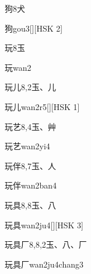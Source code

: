 \begin{entry}{狗}{8}{⽝}
  \begin{phonetics}{狗}{gou3}[][HSK 2]
  \end{phonetics}
\end{entry}

\begin{entry}{玩}{8}{⽟}
  \begin{phonetics}{玩}{wan2}
  \end{phonetics}
\end{entry}

\begin{entry}{玩儿}{8,2}{⽟、⼉}
  \begin{phonetics}{玩儿}{wan2r5}[][HSK 1]
  \end{phonetics}
\end{entry}

\begin{entry}{玩艺}{8,4}{⽟、⾋}
  \begin{phonetics}{玩艺}{wan2yi4}
  \end{phonetics}
\end{entry}

\begin{entry}{玩伴}{8,7}{⽟、⼈}
  \begin{phonetics}{玩伴}{wan2ban4}
  \end{phonetics}
\end{entry}

\begin{entry}{玩具}{8,8}{⽟、⼋}
  \begin{phonetics}{玩具}{wan2ju4}[][HSK 3]
  \end{phonetics}
\end{entry}

\begin{entry}{玩具厂}{8,8,2}{⽟、⼋、⼚}
  \begin{phonetics}{玩具厂}{wan2ju4chang3}
  \end{phonetics}
\end{entry}

